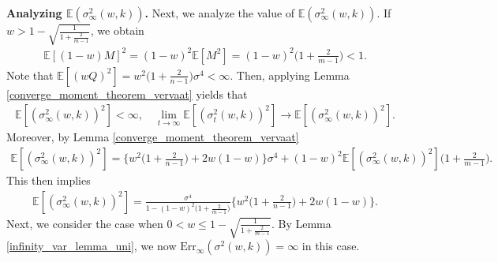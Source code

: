 \textbf{Analyzing $\mathbb{E}(\sigma_\infty^2(w,k))$.} Next, we analyze the value of $\mathbb{E}(\sigma_\infty^2(w,k))$. If \(w > 1 - \sqrt{\frac{1}{1+\frac{2}{m-1}}}\), we obtain
\begin{align*}
\mathbb{E}[(1-w)M]^2 = (1-w)^2\mathbb{E}[M^2] = (1-w)^2\bigl(1 + \frac{2}{m-1}\bigr) < 1.
\end{align*}
Note that $\mathbb{E}[(wQ)^2] = w^2\bigl(1 + \frac{2}{n-1}\bigr)\sigma^4 < \infty$. Then, applying Lemma \ref{converge_moment_theorem_vervaat} yields that
\begin{align*}
\mathbb{E}[(\sigma_{\infty}^2(w,k))^2] < \infty, \quad \lim_{t \to \infty} \mathbb{E}[(\sigma_t^2(w,k))^2] \to \mathbb{E}[(\sigma_\infty^2(w,k))^2].
\end{align*}
Moreover, by Lemma \ref{converge_moment_theorem_vervaat}
\begin{align*}
\mathbb{E}[(\sigma_{\infty}^2(w,k))^2] 
= \bigl\{w^2\bigl(1 + \frac{2}{n-1}\bigr) + 2w(1-w)\bigr\}\sigma^4 + (1-w)^2\mathbb{E}[(\sigma_{\infty}^2(w,k))^2]\bigl(1 + \frac{2}{m-1}\bigr).
\end{align*}
This then implies
\begin{align}
\label{square_secondmoment}
\mathbb{E}[(\sigma_{\infty}^2(w,k))^2] = \frac{\sigma^4}{1 - (1-w)^2\bigl(1+\frac{2}{m-1}\bigr)}\bigl\{w^2\bigl(1 + \frac{2}{n-1}\bigr) + 2w(1-w)\bigr\}.
\end{align}
Next, we consider the case when \(0 < w \leq 1 - \sqrt{\frac{1}{1+\frac{2}{m-1}}}\). By Lemma \ref{infinity_var_lemma_uni}, we now $\mathrm{Err}_{\infty}(\sigma^2(w,k)) = \infty$ in this case.

